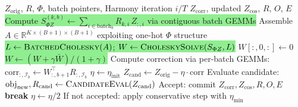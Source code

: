 \documentclass[8pt]{article}
\begin{document}
\begin{tcolorbox}[
    title={\textbf{Algorithm 2b:} harmony\_272 --- Batched Cholesky + Trust-region Backtracking},
    colback=lightgreen!20, colframe=added!80, fonttitle=\small\bfseries,
    boxrule=0.5pt, arc=2pt, left=4pt, right=4pt, top=2pt, bottom=2pt
]
\begin{algorithmic}[1]
\small
\Require $Z_{\text{orig}}$, $R$, $\Phi$, batch pointers, Harmony iteration $i/T$
\Ensure $Z_{\text{corr}}$, updated $Z_{\text{cos}}$, $R$, $O$, $E$
\State \colorbox{lightgreen}{Compute $S_{\Phi Z}^{(k,b)} \gets \sum_{i \in \text{batch}_b} R_{k,i} \, Z_{:,i}$ via contiguous batch GEMMs}
\State Assemble $A \in \mathbb{R}^{K \times (B+1) \times (B+1)}$ exploiting one-hot $\Phi$ structure
\State \colorbox{lightgreen}{$L \gets \textsc{BatchedCholesky}(A)$; \quad $W \gets \textsc{CholeskySolve}(S_{\Phi Z}, L)$} \Comment{\textcolor{added}{Replaces $K$ separate inverses}}
\State $W[:,0,:] \gets 0$
\State \colorbox{lightgreen}{$W \gets (W + \gamma \bar{W}) / (1 + \gamma)$} \Comment{\textcolor{added}{Tie-to-mean regularization}}
\State Compute correction via per-batch GEMMs: $\text{corr}_{:,\mathcal{I}_b} \gets W_{:,b+1}^\top R_{:,\mathcal{I}_b}$
\State $\eta \gets \eta_{\text{init}}$ 
 \Comment{\textcolor{added}{Trust-region backtracking}}
    \State $Z_{\text{cand}} \gets Z_{\text{orig}} - \eta \cdot \text{corr}$
    \State Evaluate candidate: $\text{obj}_{\text{new}}, R_{\text{cand}} \gets \textsc{CandidateEval}(Z_{\text{cand}})$
        \State Accept: commit $Z_{\text{corr}}, Z_{\text{cos}}, R, O, E$ \Comment{\textcolor{added}{Objective must improve}}
        \State \textbf{break}
    \EndIf
    \State $\eta \gets \eta / 2$
\EndFor
\State If not accepted: apply conservative step with $\eta_{\min}$
\end{algorithmic}
\end{tcolorbox}

\vspace{4pt}
\end{document}
